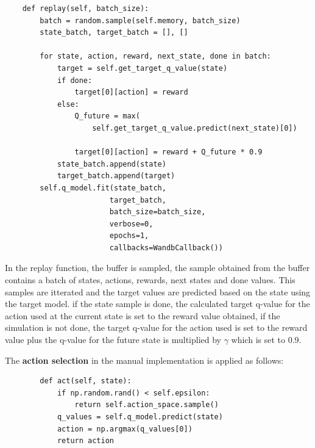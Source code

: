\lstset{language=Python}
\lstset{frame=lines}
\lstset{basicstyle=\footnotesize}
\begin{lstlisting}
    def replay(self, batch_size):
        batch = random.sample(self.memory, batch_size)
        state_batch, target_batch = [], []

        for state, action, reward, next_state, done in batch:
            target = self.get_target_q_value(state)
            if done:
                target[0][action] = reward
            else:
                Q_future = max(
                    self.get_target_q_value.predict(next_state)[0])

                target[0][action] = reward + Q_future * 0.9
            state_batch.append(state)
            target_batch.append(target)
        self.q_model.fit(state_batch,
                        target_batch,
                        batch_size=batch_size,
                        verbose=0,
                        epochs=1,
                        callbacks=WandbCallback())
\end{lstlisting}

In the replay function, the buffer is sampled, the sample obtained from the buffer contains a batch of states, actions, rewards, next states and done values.
This samples are itterated and the target values are predicted based on the state using the target model.
if the state sample is done, the calculated target q-value for the action used at the current state is set to the reward value obtained, if the simulation is not done, the target q-value for the action used is set to the reward value plus the q-value for the future state is multiplied by $\gamma$ which is set to 0.9.

The \textbf{action selection} in the manual implementation is applied as follows:

    \lstset{language=Python}
    \lstset{frame=lines}
    \lstset{basicstyle=\footnotesize}
    \begin{lstlisting}
        def act(self, state):
            if np.random.rand() < self.epsilon:
                return self.action_space.sample()
            q_values = self.q_model.predict(state)
            action = np.argmax(q_values[0])
            return action
    \end{lstlisting}

